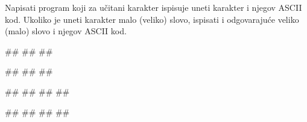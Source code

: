 \begin{Exercise}[label=v1.2_08] 
Napisati program koji za učitani karakter ispisuje uneti karakter i njegov ASCII kod. Ukoliko je uneti karakter malo (veliko) slovo, ispisati i odgovarajuće veliko (malo) slovo i njegov ASCII kod.

\begin{miditest}
\begin{upotreba}{1}
#\naslovInt#
##
##
\end{upotreba}
\end{miditest}
\begin{miditest}
\begin{upotreba}{2}
#\naslovInt#
##
##
\end{upotreba}
\end{miditest}

\begin{maxitest}
\begin{upotreba}{3}
#\naslovInt#
##
##
##
\end{upotreba}
\end{maxitest}

\begin{maxitest}
\begin{upotreba}{4}
#\naslovInt#
##
##
##
\end{upotreba}
\end{maxitest}

\end{Exercise}
\begin{Answer}[ref=v1.2_08]
\end{Answer}


